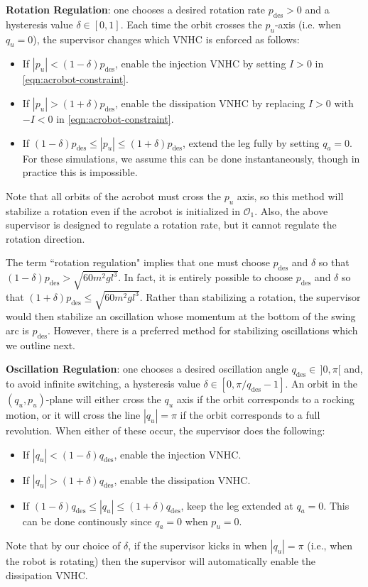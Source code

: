 \documentclass[journal,twoside,web, twocolumn,draftcls]{ieeecolor}
\begin{document}
\textbf{Rotation Regulation}: one chooses a desired rotation rate 
\(p_\text{des} > 0\) and a hysteresis value \(\delta \in [0,1]\).
Each time the orbit crosses the \(p_u\)-axis (i.e. when \(q_u = 0\)), the
supervisor changes which VNHC is enforced as follows:
\begin{itemize}
    \item If \(|p_u| < (1-\delta)p_\text{des}\), enable the injection VNHC by
        setting \(I > 0\) in \eqref{eqn:acrobot-constraint}.
    \item If \(|p_u| > (1+\delta)p_\text{des}\), enable the dissipation VNHC by
        replacing \(I > 0\) with \(-I < 0\) in \eqref{eqn:acrobot-constraint}.
    \item If \((1-\delta)p_\text{des} \leq |p_u| \leq (1+\delta)p_\text{des}\),
        extend the leg fully by setting \(q_a = 0\).
        For these simulations, we assume this can be done instantaneously,
        though in practice this is impossible.
\end{itemize}
Note that all orbits of the acrobot must cross the \(p_u\) axis, 
so this method will stabilize a rotation even if the acrobot is initialized in
\(\mathcal{O}_1\).
Also, the above supervisor is designed to regulate a rotation rate, but it
cannot regulate the rotation direction.

The term ``rotation regulation" implies that one must choose
\(p_\text{des}\) and \(\delta\) so that 
\((1-\delta) p_\text{des} > \sqrt{60m^2gl^3}\).
In fact, it is entirely possible to choose \(p_\text{des}\) and \(\delta\) so
that \((1+\delta)p_\text{des} \leq \sqrt{60m^2gl^3}\).
Rather than stabilizing a rotation, the supervisor would then stabilize an
oscillation whose momentum at the bottom of the swing arc is \(p_\text{des}\).
However, there is a preferred method for stabilizing oscillations
which we outline next.

\textbf{Oscillation Regulation}: one chooses a desired oscillation angle 
\(q_\text{des} \in \, ]0,\pi[\) and, to avoid infinite switching, a
hysteresis value \(\delta \in [0,\pi/q_\text{des} - 1]\).
An orbit in the \((q_u,p_u)\)-plane will either cross the \(q_u\) axis if the
orbit corresponds to a rocking motion, or it will cross the line \(|q_u| = \pi\)
if the orbit corresponds to a full revolution.
When either of these occur, the supervisor does the following: 
\begin{itemize}
    \item If \(|q_u| < (1-\delta)q_\text{des}\), enable the injection VNHC.
    \item If \(|q_u| > (1+\delta)q_\text{des}\), enable the dissipation VNHC.
    \item If \((1-\delta)q_\text{des} \leq |q_u| \leq (1+\delta)q_\text{des}\),
        keep the leg extended at \(q_a = 0\). This can be done continously since
        \(q_a = 0\) when \(p_u = 0\).
\end{itemize}
Note that by our choice of \(\delta\), if the supervisor kicks in when 
\(|q_u| = \pi\) (i.e., when the robot is rotating) then the supervisor will
automatically enable the dissipation VNHC.
\end{document}
